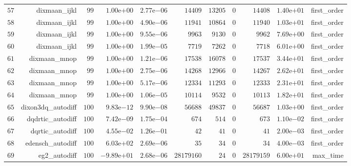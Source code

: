 \documentclass[varwidth=20cm,crop=true]{standalone}
\begin{document}
\begin{longtable}{rrrrrrrrrrr}
  \(    57\) & dixmaan\_ijkl & \(    99\) & \( 1.00\)e\(+00\) & \( 2.77\)e\(-06\) & \( 14409\) & \( 13205\) & \(     0\) & \( 14408\) & \( 1.40\)e\(+01\) & first\_order \\
  \(    58\) & dixmaan\_ijkl & \(    99\) & \( 1.00\)e\(+00\) & \( 4.90\)e\(-06\) & \( 11941\) & \( 10864\) & \(     0\) & \( 11940\) & \( 1.03\)e\(+01\) & first\_order \\
  \(    59\) & dixmaan\_ijkl & \(    99\) & \( 1.00\)e\(+00\) & \( 9.55\)e\(-06\) & \(  9963\) & \(  9130\) & \(     0\) & \(  9962\) & \( 7.69\)e\(+00\) & first\_order \\
  \(    60\) & dixmaan\_ijkl & \(    99\) & \( 1.00\)e\(+00\) & \( 1.99\)e\(-05\) & \(  7719\) & \(  7262\) & \(     0\) & \(  7718\) & \( 6.01\)e\(+00\) & first\_order \\
  \(    61\) & dixmaan\_mnop & \(    99\) & \( 1.00\)e\(+00\) & \( 1.21\)e\(-06\) & \( 17538\) & \( 16078\) & \(     0\) & \( 17537\) & \( 3.44\)e\(+01\) & first\_order \\
  \(    62\) & dixmaan\_mnop & \(    99\) & \( 1.00\)e\(+00\) & \( 2.75\)e\(-06\) & \( 14268\) & \( 12966\) & \(     0\) & \( 14267\) & \( 2.62\)e\(+01\) & first\_order \\
  \(    63\) & dixmaan\_mnop & \(    99\) & \( 1.00\)e\(+00\) & \( 5.17\)e\(-06\) & \( 12334\) & \( 11293\) & \(     0\) & \( 12333\) & \( 2.31\)e\(+01\) & first\_order \\
  \(    64\) & dixmaan\_mnop & \(    99\) & \( 1.00\)e\(+00\) & \( 1.06\)e\(-05\) & \( 10114\) & \(  9532\) & \(     0\) & \( 10113\) & \( 1.82\)e\(+01\) & first\_order \\
  \(    65\) & dixon3dq\_autodiff & \(   100\) & \( 9.83\)e\(-12\) & \( 9.90\)e\(-08\) & \( 56688\) & \( 49837\) & \(     0\) & \( 56687\) & \( 1.03\)e\(+00\) & first\_order \\
  \(    66\) & dqdrtic\_autodiff & \(   100\) & \( 7.42\)e\(-09\) & \( 1.75\)e\(-04\) & \(   674\) & \(   514\) & \(     0\) & \(   673\) & \( 1.10\)e\(-02\) & first\_order \\
  \(    67\) & dqrtic\_autodiff & \(   100\) & \( 4.55\)e\(-02\) & \( 1.26\)e\(-01\) & \(    42\) & \(    41\) & \(     0\) & \(    41\) & \( 2.00\)e\(-03\) & first\_order \\
  \(    68\) & edensch\_autodiff & \(   100\) & \( 6.03\)e\(+02\) & \( 2.69\)e\(-06\) & \(    35\) & \(    34\) & \(     0\) & \(    34\) & \( 4.00\)e\(-03\) & first\_order \\
  \(    69\) & eg2\_autodiff & \(   100\) & \(-9.89\)e\(+01\) & \( 2.68\)e\(-06\) & \(28179160\) & \(    24\) & \(     0\) & \(28179159\) & \( 6.00\)e\(+01\) & max\_time \\

\end{longtable}
\end{document}
